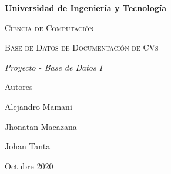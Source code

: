 \begin{titlepage}
    \centering
    {\bfseries\LARGE Universidad de Ingeniería y Tecnología \par}
    \vspace{1cm}
    {\scshape\Large Ciencia de Computación\par}
    \vspace{3cm}
    {\scshape\Huge Base de Datos de Documentación de CVs \par}
    \vspace{3cm}
    {\itshape\Large Proyecto - Base de Datos I \par}
    \vfill
    {\Large Autores\par}
    {\Large Alejandro Mamani \par}
    {\Large Jhonatan Macazana \par}
    {\Large Johan Tanta \par}
    \vfill
    {\Large Octubre 2020 \par}
\end{titlepage}